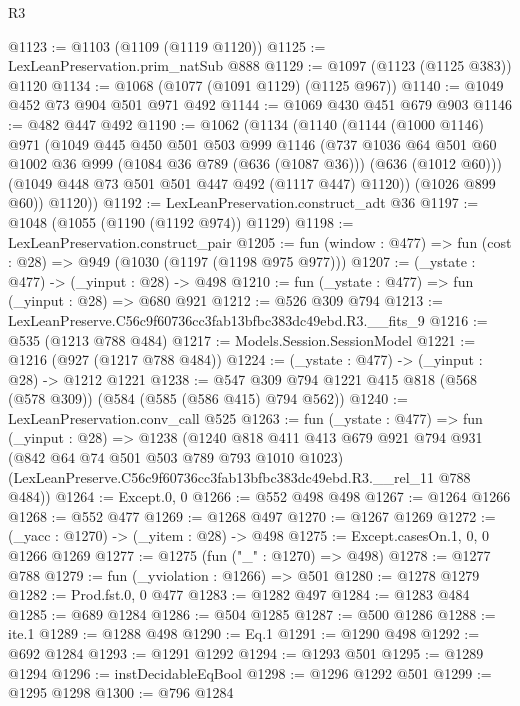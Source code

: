 \begin{lexlean}{R3}
\begin{coremodule}
@1123 := @1103 (@1109 (@1119 @1120))
@1125 := LexLeanPreservation.prim_natSub @888
@1129 := @1097 (@1123 (@1125 @383)) @1120
@1134 := @1068 (@1077 (@1091 @1129) (@1125 @967))
@1140 := @1049 @452 @73 @904 @501 @971 @492
@1144 := @1069 @430 @451 @679 @903
@1146 := @482 @447 @492
@1190 := @1062
    (@1134
      (@1140
        (@1144
          (@1000 @1146)
          @971
          (@1049
            @445
            @450
            @501
            @503
            @999
            @1146
            (@737
              @1036
              @64
              @501
              @60
              @1002
              @36
              @999
              (@1084 @36 @789 (@636 (@1087 @36)))
              (@636 (@1012 @60)))
            (@1049 @448 @73 @501 @501 @447 @492 (@1117 @447) @1120))
          (@1026 @899 @60))
        @1120))
@1192 := LexLeanPreservation.construct_adt @36
@1197 := @1048 (@1055 (@1190 (@1192 @974)) @1129)
@1198 := LexLeanPreservation.construct_pair
@1205 := fun (window : @477) => fun (cost : @28) => @949 (@1030 (@1197 (@1198 @975 @977)))
@1207 := (_ystate : @477) -> (_yinput : @28) -> @498
@1210 := fun (_ystate : @477) => fun (_yinput : @28) => @680 @921
@1212 := @526 @309 @794
@1213 := LexLeanPreserve.C56c9f60736cc3fab13bfbc383dc49ebd.R3.__fits_9
@1216 := @535 (@1213 @788 @484)
@1217 := Models.Session.SessionModel
@1221 := @1216 (@927 (@1217 @788 @484))
@1224 := (_ystate : @477) -> (_yinput : @28) -> @1212 @1221
@1238 := @547 @309 @794 @1221 @415 @818 (@568 (@578 @309)) (@584 (@585 (@586 @415) @794 @562))
@1240 := LexLeanPreservation.conv_call @525
@1263 := fun (_ystate : @477) =>
  fun (_yinput : @28) =>
  @1238
    (@1240
      @818
      @411
      @413
      @679
      @921
      @794
      @931
      (@842 @64 @74 @501 @503 @789 @793 @1010 @1023)
      (LexLeanPreserve.C56c9f60736cc3fab13bfbc383dc49ebd.R3.__rel_11 @788 @484))
@1264 := Except.{0, 0}
@1266 := @552 @498 @498
@1267 := @1264 @1266
@1268 := @552 @477
@1269 := @1268 @497
@1270 := @1267 @1269
@1272 := (_yacc : @1270) -> (_yitem : @28) -> @498
@1275 := Except.casesOn.{1, 0, 0} @1266 @1269
@1277 := @1275 (fun ("_" : @1270) => @498)
@1278 := @1277 @788
@1279 := fun (_yviolation : @1266) => @501
@1280 := @1278 @1279
@1282 := Prod.fst.{0, 0} @477
@1283 := @1282 @497
@1284 := @1283 @484
@1285 := @689 @1284
@1286 := @504 @1285
@1287 := @500 @1286
@1288 := ite.{1}
@1289 := @1288 @498
@1290 := Eq.{1}
@1291 := @1290 @498
@1292 := @692 @1284
@1293 := @1291 @1292
@1294 := @1293 @501
@1295 := @1289 @1294
@1296 := instDecidableEqBool
@1298 := @1296 @1292 @501
@1299 := @1295 @1298
@1300 := @796 @1284

\end{coremodule}
\end{lexlean}
